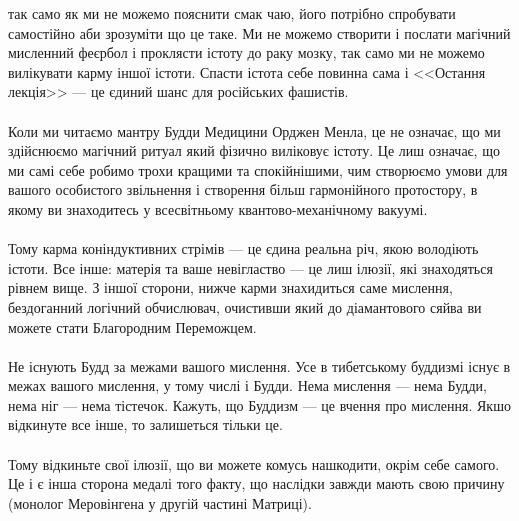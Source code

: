 так само як ми не можемо пояснити смак чаю, його потрібно спробувати самостійно аби зрозуміти що це таке.
Ми не можемо створити і послати магічний мисленний феєрбол і проклясти істоту до раку мозку, так само ми не можемо
вилікувати карму іншої істоти. Спасти істота себе повинна сама і <<Остання лекція>> --- це єдиний шанс для російських фашистів.
\\
\\
Коли ми читаємо мантру Будди Медицини Орджен Менла, це не означає, що ми здійснюємо магічний ритуал який фізично виліковує істоту.
Це лиш означає, що ми самі себе робимо трохи кращими та спокійнішими, чим створюємо умови для вашого особистого звільнення і створення
більш гармонійного протостору, в якому ви знаходитесь у всесвітньому квантово-механічному вакуумі.
\\
\\
Тому карма коніндуктивних стрімів --- це єдина реальна річ, якою володіють істоти. Все інше: матерія та ваше
невігластво --- це лиш ілюзії, які знаходяться рівнем вище.
З іншої сторони, нижче карми знахидиться саме мислення, бездоганний логічний обчислювач, очистивши який до діамантового сяйва
ви можете стати Благородним Переможцем.
\\
\\
Не існують Будд за межами вашого мислення. Усе в тибетському буддизмі існує в межах вашого мислення, у тому числі і Будди.
Нема мислення --- нема Будди, нема ніг --- нема тістечок. Кажуть, що Буддизм --- це вчення про мислення. Якшо відкинуте все
інше, то залишеться тільки це.
\\
\\
Тому відкиньте свої ілюзії, що ви можете комусь нашкодити, окрім себе самого. Це і є інша сторона медалі того факту,
що наслідки завжди мають свою причину (монолог Меровінгена у другій частині Матриці).


